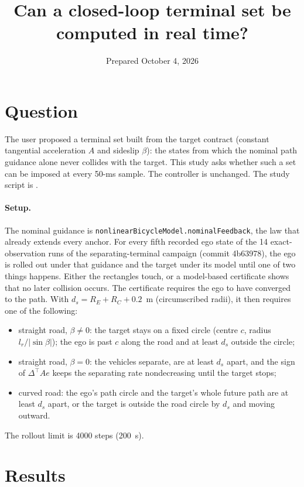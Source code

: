 \documentclass[11pt]{article}
\title{Can a closed-loop terminal set be computed in real time?}
\date{Prepared October 4, 2026}
\begin{document}
\maketitle

\section{Question}
The user proposed a terminal set built from the target contract (constant
tangential acceleration $A$ and sideslip $\beta$): the states from which the
nominal path guidance alone never collides with the target. This study asks
whether such a set can be imposed at every 50-ms sample. The controller is
unchanged. The study script is .

\paragraph{Setup.} The nominal guidance is \texttt{nonlinearBicycleModel.nominalFeedback}, the
law that already extends every anchor. For every fifth recorded ego state of the
14 exact-observation runs of the separating-terminal campaign (commit 4b63978),
the ego is rolled out under that guidance and the target under its model until
one of two things happens. Either the rectangles touch, or a model-based
certificate shows that no later collision occurs. The certificate requires the
ego to have converged to the path. With $d_s=R_E+R_C+0.2$~m
(circumscribed radii), it then requires one of the following:
\begin{itemize}
\item straight road, $\beta\neq0$: the target stays on a fixed circle (centre
  $c$, radius $l_r/|\sin\beta|$); the ego is past $c$ along the road and at
  least $d_s$ outside the circle;
\item straight road, $\beta=0$: the vehicles separate, are at least $d_s$
  apart, and the sign of $\Delta^\top Ae$ keeps the separating rate
  nondecreasing until the target stops;
\item curved road: the ego's path circle and the target's whole future path
  are at least $d_s$ apart, or the target is outside the road circle by $d_s$
  and moving outward.
\end{itemize}
The rollout limit is 4000 steps (200~s).

\section{Results}
\end{document}
